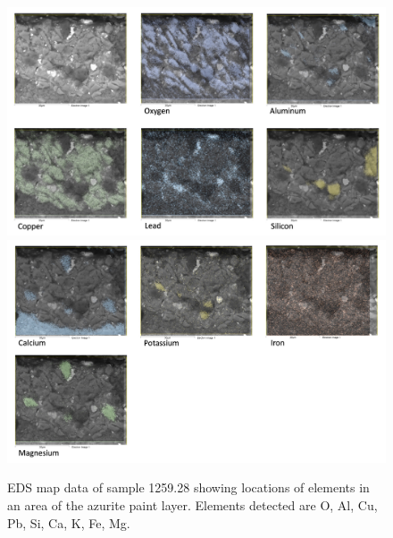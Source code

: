 \begin{figure}[H]
\centering
\begin{minipage}[t]{\linewidth}
  \centering
  \includegraphics[width=0.9\linewidth]{1259-28_mapdata_1}
\hfill
\includegraphics[width=0.9\linewidth]{1259-28_mapdata_2}
\hfill
\end{minipage}
\caption[EDS map data, sample 1259.28.]{EDS map data of sample 1259.28 showing locations of elements in an area of the azurite paint layer. Elements detected are O, Al, Cu, Pb, Si, Ca, K, Fe, Mg.}
\label{fig:1259.28_mapdata}
\end{figure}

